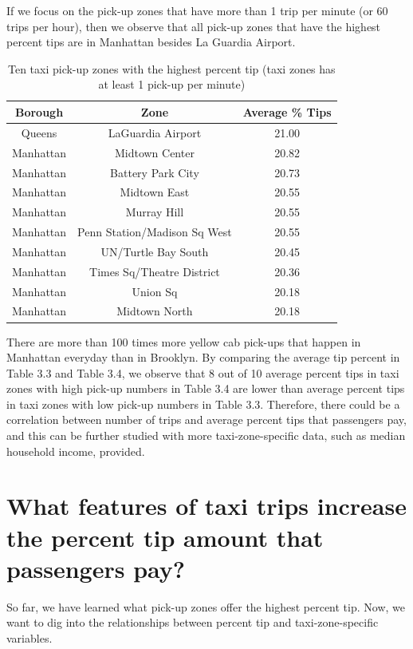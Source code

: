 \documentclass[12pt,twoside]{reedthesis}
\theoremstyle{definition}
\theoremstyle{definition}
\theoremstyle{definition}
\theoremstyle{remark}
\begin{document}
If we focus on the pick-up zones that have more than 1 trip per minute
(or 60 trips per hour), then we observe that all pick-up zones that have
the highest percent tips are in Manhattan besides La Guardia Airport.
\begin{table}

\caption{\label{tab:unnamed-chunk-46}Ten taxi pick-up zones with the highest percent tip (taxi zones has at least 1 pick-up per minute)}
\centering
\begin{tabular}[t]{ccc}
\toprule
Borough & Zone & Average \% Tips\\
\midrule
Queens & LaGuardia Airport & 21.00\\
Manhattan & Midtown Center & 20.82\\
Manhattan & Battery Park City & 20.73\\
Manhattan & Midtown East & 20.55\\
Manhattan & Murray Hill & 20.55\\
\addlinespace
Manhattan & Penn Station/Madison Sq West & 20.55\\
Manhattan & UN/Turtle Bay South & 20.45\\
Manhattan & Times Sq/Theatre District & 20.36\\
Manhattan & Union Sq & 20.18\\
Manhattan & Midtown North & 20.18\\
\bottomrule
\end{tabular}
\end{table}
There are more than 100 times more yellow cab pick-ups that happen in
Manhattan everyday than in Brooklyn. By comparing the average tip
percent in Table 3.3 and Table 3.4, we observe that 8 out of 10 average
percent tips in taxi zones with high pick-up numbers in Table 3.4 are
lower than average percent tips in taxi zones with low pick-up numbers
in Table 3.3. Therefore, there could be a correlation between number of
trips and average percent tips that passengers pay, and this can be
further studied with more taxi-zone-specific data, such as median
household income, provided.

\section{What features of taxi trips increase the percent tip amount
that passengers
pay?}\label{what-features-of-taxi-trips-increase-the-percent-tip-amount-that-passengers-pay}

So far, we have learned what pick-up zones offer the highest percent
tip. Now, we want to dig into the relationships between percent tip and
taxi-zone-specific variables.
\end{document}
